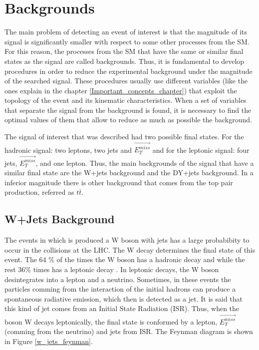  \section{Backgrounds}
 
The main problem of detecting an event of interest is that the magnitude of its signal is significantly smaller with respect to some other processes from the SM. For this reason, the processes from the
SM that have the same or similar final states as the signal are called backgrounds. Thus, it is fundamental to develop procedures in order to reduce the experimental background under the magnitude 
of the searched signal. These procedures usually use different variables (like the ones explain in the chapter \ref{Important_concepts_chapter}) that exploit the topology of the event and its 
kinematic characteristics. When a set of variables that separate the signal from the background is found, it is necessary to find the optimal values of them that allow to reduce as much as possible 
the background. 
 
The signal of interest that was described had two possible final states. For the hadronic signal: two leptons, two jets and $\vec{E_T^{miss}}$ and for the leptonic signal: four jets, 
$\vec{E_T^{miss}}$, and one lepton. Thus, the main backgrounds of the signal that have a similar final state are the W+jets background and the DY+jets background. In a inferior magnitude there
is other background that comes from the top pair production, referred as $t\overline{t}$.

 
\subsection{W+Jets Background}
  
The events in which is produced a W boson with jets has a large probabibity to occur in the collisions at the LHC. The W decay determines the final state of this event. The 64 \% of the times the 
W boson has a hadronic decay and while the rest 36\% times has a leptonic decay \cite{Tesis_luis_alfredo}. In leptonic decays, the W boson desintegrates into a lepton and a neutrino. Sometimes, in these events the particles 
comming from the interaction of the initial hadrons can produce a spontaneous radiative emission, which then is detected as a jet. It is said that this kind of jet comes from an Initial State 
Radiation (ISR). Thus, when the boson W decays leptonically, the final state is conformed by a lepton, $\vec{E_T^{miss}}$ (comming from the neutrino) and jets from ISR. The Feynman diagram is shown 
in Figure \ref{w_jets_feynman}.


